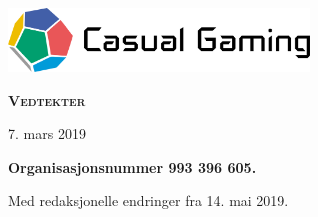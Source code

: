 \begin{titlepage}
    \centering
    \vspace*{1cm}
    \includegraphics[width=8cm]{logo-farger-tekst.png}\par
    \vspace*{4cm}
    {\rmfamily\Huge\bfseries\scshape Vedtekter}\par
    \vspace*{1cm}
    {7. mars 2019}\par
    \vfill
    {\bfseries Organisasjonsnummer 993 396 605.}\par
    \vspace*{0.5cm}
    {Med redaksjonelle endringer fra 14. mai 2019.}\par
\end{titlepage}
